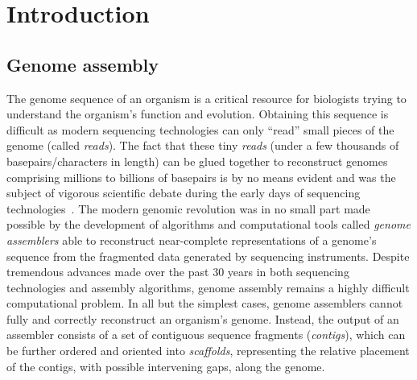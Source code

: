 
\newcommand{\edit}[1]{\textcolor{black}{#1}}

\renewcommand{\thechapter}{1}

\chapter{Introduction}

\section{Genome assembly}

The genome sequence of an organism is a critical resource for
biologists trying to understand the organism's function and
evolution.  Obtaining this sequence is difficult as modern sequencing
technologies can only ``read'' small pieces of the genome (called
\emph{reads}).  The fact that these tiny \emph{reads} (under a few
thousands of basepairs/characters in length) can be glued together to reconstruct genomes
comprising millions to billions of basepairs is by no means evident
and was the subject of vigorous scientific debate during the early
days of sequencing technologies~\cite{green1997against,weber1997human}. The modern genomic revolution was in no small part made
possible by the development of algorithms and computational tools called
\emph{genome assemblers} able to reconstruct near-complete
representations of a genome's sequence from the fragmented data
generated by sequencing instruments.  Despite tremendous advances made
over the past 30 years in both sequencing technologies and assembly
algorithms, genome assembly remains a highly difficult computational
problem.  In all but the simplest cases, genome assemblers cannot
fully and correctly reconstruct an organism's genome.  Instead, the
output of an assembler consists of a set of contiguous sequence
fragments (\emph{contigs}), which can be further ordered and oriented
into \emph{scaffolds}, representing the relative placement of the
contigs, with possible intervening gaps, along the genome.



